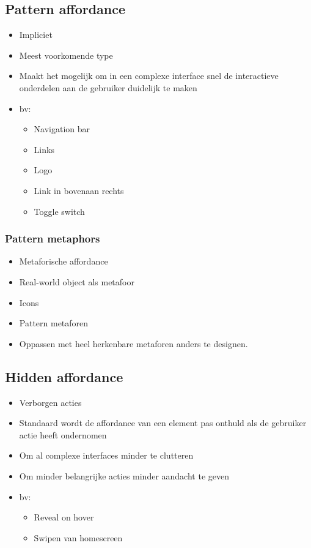 \documentclass{article}
\begin{document}
\subsection{Pattern affordance}
\begin{itemize}
    \item Impliciet 
    \item Meest voorkomende type
    \item Maakt het mogelijk om in een complexe interface snel de interactieve onderdelen aan de gebruiker duidelijk te maken
    \item bv:
    \begin{itemize}
        \item Navigation bar
        \item Links
        \item Logo
        \item Link in bovenaan rechts
        \item Toggle switch
    \end{itemize}
\end{itemize}

\subsubsection{Pattern metaphors}

\begin{itemize}
    \item Metaforische affordance
    \item Real-world object als metafoor
    \item Icons
    \item Pattern metaforen
    \item Oppassen met heel herkenbare metaforen anders te designen.
\end{itemize}

\subsection{Hidden affordance}

\begin{itemize}
    \item Verborgen acties  
    \item Standaard wordt de affordance van een element pas onthuld als de gebruiker actie heeft ondernomen
    \item Om al complexe interfaces minder te clutteren
    \item Om minder belangrijke acties minder aandacht te geven
    \item bv:
    \begin{itemize}
        \item Reveal on hover
        \item Swipen van homescreen
    \end{itemize}
\end{itemize}
\end{document}
